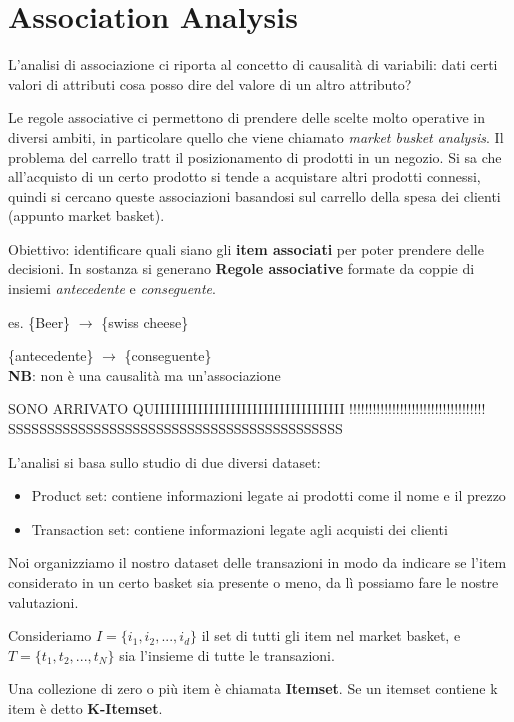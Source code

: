 

\section{Association Analysis}
L'analisi di associazione ci riporta al concetto di causalit\`a di variabili: dati certi valori di attributi cosa posso dire del valore di un altro attributo?

Le regole associative ci permettono di prendere delle scelte molto operative in diversi ambiti, in particolare quello che viene chiamato \textit{market busket analysis}. 
Il problema del carrello tratt il posizionamento di prodotti in un negozio. Si sa che all'acquisto di un certo prodotto si tende a acquistare altri prodotti connessi, quindi si cercano queste associazioni basandosi sul carrello della spesa dei clienti (appunto market basket).

Obiettivo: identificare quali siano gli \textbf{item associati} per poter prendere delle decisioni. In sostanza si generano \textbf{Regole associative} formate da coppie di insiemi \textit{antecedente} e \textit{conseguente}.

es. \{Beer\} $\rightarrow$ \{swiss cheese\} 

\quad \{antecedente\} $\rightarrow$ \{conseguente\}\\
\textbf{NB}: non \`e una causalit\`a ma un'associazione

SONO ARRIVATO QUIIIIIIIIIIIIIIIIIIIIIIIIIIIIIIIIIII !!!!!!!!!!!!!!!!!!!!!!!!!!!!!!!!!!! SSSSSSSSSSSSSSSSSSSSSSSSSSSSSSSSSSSSSSSSSSS

L'analisi si basa sullo studio di due diversi dataset:
\begin{itemize}
	\item Product set: contiene informazioni legate ai prodotti come il nome e il prezzo
	\item Transaction set: contiene informazioni legate agli acquisti dei clienti
\end{itemize}

Noi organizziamo il nostro dataset delle transazioni in modo da indicare se l'item considerato in un certo basket sia presente o meno, da l\`i possiamo fare le nostre valutazioni.

Consideriamo $I = \{i_1, i_2,...,i_d\}$ il set di tutti gli item nel market basket, e $T = \{t_1,t_2,...,t_N\}$ sia l'insieme di tutte le transazioni.

Una collezione di zero o pi\`u item \`e chiamata \textbf{Itemset}. Se un itemset contiene k item \`e detto \textbf{K-Itemset}. 

